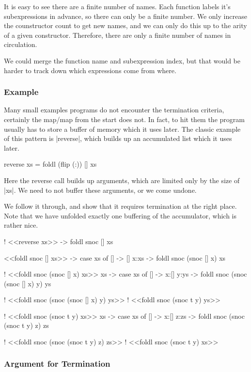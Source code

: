 \documentclass{sigplanconf}
\begin{document}
It is easy to see there are a finite number of names. Each function labels it's subexpressions in advance, so there can only be a finite number. We only increase the counstructor count to get new names, and we can only do this up to the arity of a given constructor. Therefore, there are only a finite number of names in circulation.

We could merge the function name and subexpression index, but that would be harder to track down which expressions come from where.

\subsubsection{Example}

Many small examples programs do not encounter the termination criteria, certainly the map/map from the start does not. In fact, to hit them the program usually has to store a buffer of memory which it uses later. The classic example of this pattern is |reverse|, which builds up an accumulated list which it uses later.

\begin{code}
reverse xs = foldl (flip (:)) [] xs
\end{code}

Here the reverse call builds up arguments, which are limited only by the size of |xs|. We need to not buffer these arguments, or we come undone.

We follow it through, and show that it requires termination at the right place. Note that we have unfolded exactly one buffering of the accumulator, which is rather nice.

\begin{code}
! <<reverse xs>>
\xs -> foldl snoc [] xs

<<foldl snoc [] xs>>
\xs -> case xs of
    [] -> []
    x:xs -> foldl snoc (snoc [] x) xs

! <<foldl snoc (snoc [] x) xs>>
\x xs -> case xs of
    [] -> x:[]
    y:ys -> foldl snoc (snoc (snoc [] x) y) ys

! <<foldl snoc (snoc (snoc [] x) y) ys>>
! <<foldl snoc (snoc t y) ys>>

! <<foldl snoc (snoc t y) xs>>
\x xs -> case xs of
    [] -> x:[]
    z:zs -> foldl snoc (snoc (snoc t y) z) zs

! <<foldl snoc (snoc (snoc t y) z) zs>>
! <<foldl snoc (snoc t y) xs>>
\end{code}


\subsubsection{Argument for Termination}
\end{document}
